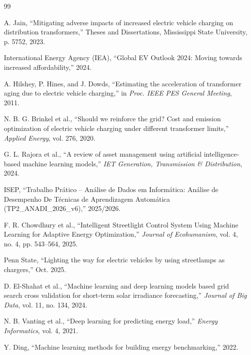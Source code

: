 \documentclass[conference]{IEEEtran}
\begin{document}
\begin{thebibliography}{99}

A. Jain, ``Mitigating adverse impacts of increased electric vehicle charging on distribution transformers,'' Theses and Dissertations, Mississippi State University, p. 5752, 2023.

International Energy Agency (IEA), ``Global EV Outlook 2024: Moving towards increased affordability,'' 2024.

A. Hilshey, P. Hines, and J. Dowds, ``Estimating the acceleration of transformer aging due to electric vehicle charging,'' in \textit{Proc. IEEE PES General Meeting}, 2011.

N. B. G. Brinkel et al., ``Should we reinforce the grid? Cost and emission optimization of electric vehicle charging under different transformer limits,'' \textit{Applied Energy}, vol. 276, 2020.

G. L. Rajora et al., ``A review of asset management using artificial intelligence-based machine learning models,'' \textit{IET Generation, Transmission \& Distribution}, 2024.

ISEP, ``Trabalho Pr\'{a}tico -- An\'{a}lise de Dados em Inform\'{a}tica: An\'{a}lise de Desempenho De T\'{e}cnicas de Aprendizagem Autom\'{a}tica (TP2\_ANADI\_2026\_v6),'' 2025/2026.

F. R. Chowdhury et al., ``Intelligent Streetlight Control System Using Machine Learning for Adaptive Energy Optimization,'' \textit{Journal of Ecohumanism}, vol. 4, no. 4, pp. 543--564, 2025.

Penn State, ``Lighting the way for electric vehicles by using streetlamps as chargers,'' Oct. 2025.

D. El-Shahat et al., ``Machine learning and deep learning models based grid search cross validation for short-term solar irradiance forecasting,'' \textit{Journal of Big Data}, vol. 11, no. 134, 2024.


N. B. Vanting et al., ``Deep learning for predicting energy load,'' \textit{Energy Informatics}, vol. 4, 2021.

Y. Ding, ``Machine learning methods for building energy benchmarking,'' 2022.


\end{thebibliography}
\end{document}
